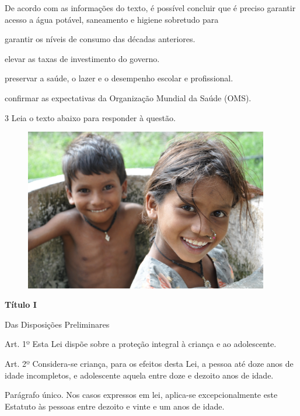 De acordo com as informações do texto, é possível concluir que é preciso 
garantir acesso a água potável, saneamento e higiene sobretudo para

\begin{escolha}

    \item garantir os níveis de consumo das décadas anteriores. 

    \item elevar as taxas de investimento do governo.
  
    \item preservar a saúde, o lazer e o desempenho escolar e profissional.
  
    \item confirmar as expectativas da Organização Mundial da Saúde (OMS).

\end{escolha}

\num{3} Leia o texto abaixo para responder à questão. 

\begin{myquote}

\begin{figure}[H]
\centering
\includegraphics[width=0.95\textwidth]{./imgSAEB_7_POR/media/image70.png}
\end{figure} 

\textbf{Título I}

Das Disposições Preliminares

Art. 1º Esta Lei dispõe sobre a proteção integral à criança e ao
adolescente.

Art. 2º Considera-se criança, para os efeitos desta Lei, a pessoa até
doze anos de idade incompletos, e adolescente aquela entre doze e
dezoito anos de idade.

Parágrafo único. Nos casos expressos em lei, aplica-se excepcionalmente
este Estatuto às pessoas entre dezoito e vinte e um anos de idade.


\end{myquote}

